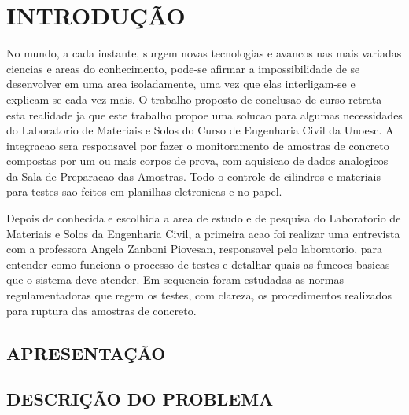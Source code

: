 \chapter{INTRODUÇÃO} %
No mundo, a cada instante, surgem novas tecnologias e avancos nas mais variadas ciencias e areas do conhecimento, pode-se afirmar a impossibilidade de se desenvolver em uma area isoladamente, uma vez que elas interligam-se e explicam-se cada vez mais. O trabalho proposto de conclusao de curso retrata esta realidade ja que este trabalho propoe uma solucao para algumas necessidades do Laboratorio de Materiais e Solos do Curso de Engenharia Civil da Unoesc. A integracao sera responsavel por fazer o monitoramento de amostras de concreto compostas por um ou mais corpos de prova, com aquisicao de dados analogicos da Sala de Preparacao das Amostras. Todo o controle de cilindros e materiais para testes sao feitos em planilhas eletronicas e no papel.

Depois de conhecida e escolhida a area de estudo e de pesquisa do Laboratorio de Materiais e Solos da Engenharia Civil, a primeira acao foi realizar uma entrevista com a professora Angela Zanboni Piovesan, responsavel pelo laboratorio, para entender como funciona o processo de testes e detalhar quais as funcoes basicas que o sistema deve atender. Em sequencia foram estudadas as normas regulamentadoras que regem os testes, com clareza, os procedimentos realizados para ruptura das amostras de concreto.
\section{APRESENTAÇÃO}
\lipsum[1-1]

\section{DESCRIÇÃO DO PROBLEMA}
\lipsum[1-1]

